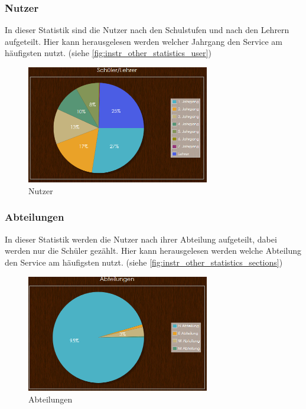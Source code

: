 \subsubsection{Nutzer}
In dieser Statistik sind die Nutzer nach den Schulstufen und nach den Lehrern aufgeteilt. Hier kann herausgelesen werden welcher Jahrgang den Service am häufigsten nutzt. (siehe \autoref{fig:instr_other_statistics_user})
\begin{figure}[H]
\centering
\includegraphics[keepaspectratio=true, width=8cm]{images/screenshots/statistics_user.png}
\caption{Nutzer}
\label{fig:instr_other_statistics_user}
\end{figure}
\subsubsection{Abteilungen}
In dieser Statistik werden die Nutzer nach ihrer Abteilung aufgeteilt, dabei werden nur die Schüler gezählt. Hier kann herausgelesen werden welche Abteilung den Service am häufigsten nutzt. (siehe \autoref{fig:instr_other_statistics_sections})
\begin{figure}[H]
\centering
\includegraphics[keepaspectratio=true, width=8cm]{images/screenshots/statistics_sections.png}
\caption{Abteilungen}
\label{fig:instr_other_statistics_sections}
\end{figure}
